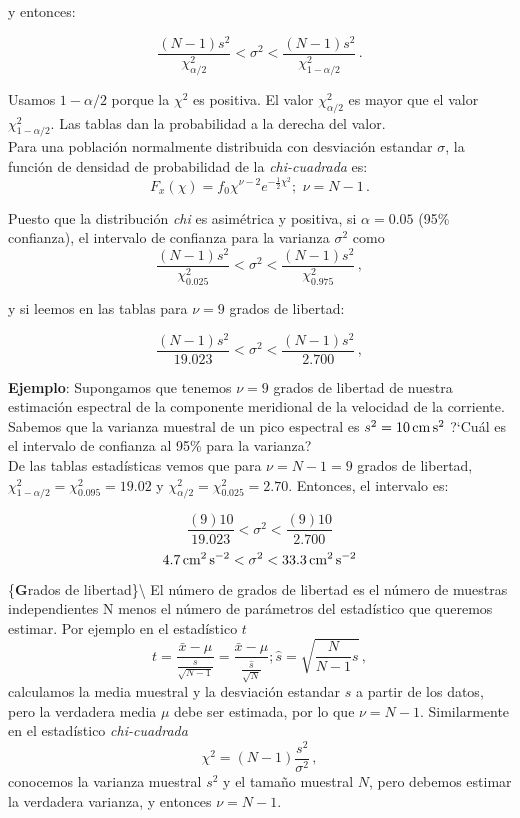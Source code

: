 \documentclass[
]{agujournal2019}
\begin{document}
y entonces:

\[\frac{(N-1)s^2}{\chi^2_{\alpha/2}}<\sigma^2<\frac{(N-1)s^2}{\chi^2_{1-\alpha/2}}\,.\]

\begin{center}
\end{center}

Usamos \(1-{\alpha/2}\) porque la \(\chi^2\) es positiva. El valor
\(\chi^2_{\alpha/2}\) es mayor que el valor \(\chi^2_{1-\alpha/2}\). Las
tablas dan la probabilidad a la derecha del valor.\\
Para una población normalmente distribuida con desviación estandar
\(\sigma\), la función de densidad de probabilidad de la
\emph{chi-cuadrada} es:
\[F_x(\chi)=f_0\chi^{\nu-2}e^{-\frac{1}{2}\chi^2};\,\,\nu=N-1\,.\]

Puesto que la distribución \emph{chi} es asimétrica y positiva, si
\(\alpha=0.05\) (95\% confianza), el intervalo de confianza para la
varianza \(\sigma^2\) como
\[\frac{(N-1)s^2}{\chi^2_{0.025}}<\sigma^2<\frac{(N-1)s^2}{\chi^2_{0.975}}\,,\]

y si leemos en las tablas para \(\nu=9\) grados de libertad:

\[\frac{(N-1)s^2}{19.023}<\sigma^2<\frac{(N-1)s^2}{2.700}\,,\]

\textbf{Ejemplo}: Supongamos que tenemos \(\nu=9\) grados de libertad de
nuestra estimación espectral de la componente meridional de la velocidad
de la corriente. Sabemos que la varianza muestral de un pico espectral
es \(s^2=10\,{\rm cm}\,{\rm s}^2\) ?{}`Cuál es el intervalo de confianza
al 95\% para la varianza?\\

De las tablas estadísticas vemos que para \(\nu=N-1=9\) grados de
libertad, \(\chi^2_{1-\alpha/2}=\chi^2_{0.095}=19.02\) y
\(\chi^2_{\alpha/2}=\chi^2_{0.025}=2.70\). Entonces, el intervalo es:

\[\frac{(9)10}{19.023}<\sigma^2<\frac{(9)10}{2.700}\]
\[4.7\,{\rm cm}^2\,{\rm s}^{-2}<\sigma^2<33.3\,{\rm cm}^2\,{\rm s}^{-2}\]

\vspace{0.5cm}

\{\noindent \textbf Grados de libertad\}\textbackslash{} El número de
grados de libertad es el número de muestras independientes N menos el
número de parámetros del estadístico que queremos estimar. Por ejemplo
en el estadístico \(t\)
\[t=\frac{\bar{x}-\mu}{\frac{s}{\sqrt{N-1}}}=\frac{\bar{x}-\mu}{\frac{\hat{s}}{\sqrt{N}}};
\hat{s}=\sqrt{\frac{N}{N-1}s}\,,\] calculamos la media muestral y la
desviación estandar \(s\) a partir de los datos, pero la verdadera media
\(\mu\) debe ser estimada, por lo que \(\nu=N-1\). Similarmente en el
estadístico \emph{chi-cuadrada} \[\chi^2=(N-1)\frac{s^2}{\sigma^2}\,,\]
conocemos la varianza muestral \(s^2\) y el tamaño muestral \(N\), pero
debemos estimar la verdadera varianza, y entonces \(\nu=N-1\).
\end{document}
